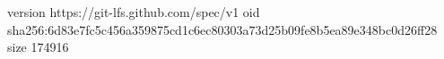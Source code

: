 version https://git-lfs.github.com/spec/v1
oid sha256:6d83e7fc5c456a359875cd1c6ec80303a73d25b09fe8b5ea89e348bc0d26ff28
size 174916
